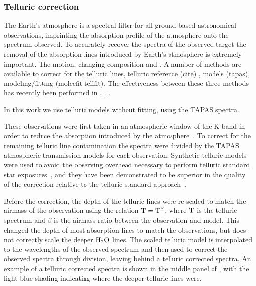 



\subsubsection{Telluric correction}
\label{subsec:telluric_correction}
The Earth's atmosphere is a spectral filter for all ground-based astronomical observations, imprinting the absorption profile of the atmosphere onto the spectrum observed. To accurately recover the spectra of the observed target the removal of the absorption lines introduced by Earth's atmosphere is extremely important. The motion, changing composition and .
A number of methods are available to correct for the telluric lines, telluric reference (cite) , models (tapas), modeling/fitting (molecfit tellfit). The effectiveness between these three methods has recently been performed in \cite{ulmer-moll_telluric_2018}.   . .

In this work we use telluric models without fitting, using the TAPAS spectra.

These observations were first taken in an atmospheric window of the K-band in order to reduce the absorption introduced by the atmosphere~\citep{barnes_hd_2008}. 
 To correct for the remaining telluric line contamination the spectra were divided by the TAPAS\citep{bertaux_tapas_2014} atmospheric transmission models for each observation. Synthetic telluric models were used to avoid the observing overhead necessary to perform telluric standard star exposures~\citep{vacca_method_2003}, and they have been demonstrated to be superior in the quality of the correction relative to the telluric standard approach~\citep[e.g.][]{cotton_atmospheric_2014}.

Before the correction, the depth of the telluric lines were re-scaled to match the airmass of the observation using the relation \(\rm T = T^{\beta} \), where \(\rm T\) is the telluric spectrum and \(\beta \) is the airmass ratio between the observation and model. This changed the depth of most absorption lines to match the observations, but does not correctly scale the deeper \(\rm H_{2}O \) lines. The scaled telluric model is interpolated to the wavelengths of the observed spectrum and then used to correct the observed spectra through division, leaving behind a telluric corrected spectra. An example of a telluric corrected spectra is shown in the middle panel of , with the light blue shading indicating where the deeper telluric lines were.

